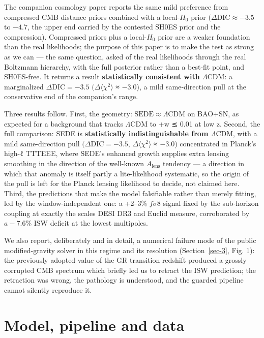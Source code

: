 \documentclass[preprint,12pt]{elsarticle}
\begin{document}
The companion cosmology paper \citep{Pandev:2026cosmology} reports the
same mild preference from compressed CMB distance priors combined with a
local-\(H_{0}\) prior \((\Delta \mathrm{DIC} \approx  -3.5\) to
\(-4.7\), the upper end carried by the contested SH0ES prior and the
compression). Compressed priors plus a local-\(H_{0}\) prior are a
weaker foundation than the real likelihoods; the purpose of this paper
is to make the test as strong as we can --- the same question, asked of
the real likelihoods through the real Boltzmann hierarchy, with the full
posterior rather than a best-fit point, and SH0ES-free. It returns a
result \textbf{statistically consistent with \(\Lambda \mathrm{CDM}\)}:
a marginalized \(\Delta \mathrm{DIC} = -3.5\)
\((\Delta\)\(\langle\chi^2\rangle\) ≈ −3.0), a mild same-direction pull
at the conservative end of the companion's range.

Three results follow. First, the geometry:
\(\mathrm{SEDE} \approx  \Lambda \mathrm{CDM}\) on BAO+SN, as expected
for a background that tracks \(\Lambda \mathrm{CDM}\) to
+w\textbar{} ≲ 0.01 at low z. Second, the full comparison: SEDE
is \textbf{statistically indistinguishable from
\(\Lambda \mathrm{CDM}\)}, with a mild same-direction pull
\((\Delta \mathrm{DIC} = -3.5\), \(\Delta\)\(\langle\chi^2\rangle\) ≈
−3.0) concentrated in Planck's high-ℓ TTTEEE, where SEDE's enhanced
growth supplies extra lensing smoothing in the direction of the
well-known \(A_{\mathrm{lens}}\) tendency
\citep{Planck:2018vyg, Calabrese:2008rt} --- a direction in which that
anomaly is itself partly a lite-likelihood systematic, so the origin of
the pull is left for the Planck lensing likelihood to decide, not
claimed here. Third, the predictions that make the model falsifiable
rather than merely fitting, led by the window-independent one: a +2--3\%
\(f\sigma 8\) signal fixed by the sub-horizon coupling at exactly the
scales DESI DR3 and Euclid measure, corroborated by \(a -7.6\)\% ISW
deficit at the lowest multipoles.

We also report, deliberately and in detail, a numerical failure mode of
the public modified-gravity solver in this regime and its resolution
(Section~\ref{sec-3}, Fig. 1): the previously adopted value of the
GR-transition redshift produced a grossly corrupted CMB spectrum which
briefly led us to retract the ISW prediction; the retraction was wrong,
the pathology is understood, and the guarded pipeline cannot silently
reproduce it.

\section{Model, pipeline and data}\label{sec-2}
\end{document}
